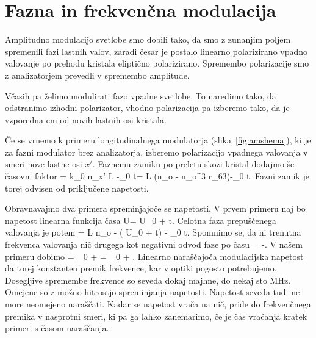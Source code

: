 \section{Fazna in frekvenčna modulacija}

Amplitudno modulacijo svetlobe smo dobili tako, da smo z zunanjim
poljem spremenili fazi lastnih valov, zaradi česar je postalo linearno
polarizirano vpadno valovanje po prehodu kristala eliptično polarizirano.
Spremembo polarizacije smo z analizatorjem prevedli v spremembo amplitude.

Včasih pa želimo modulirati fazo vpadne svetlobe. To naredimo tako,
da odstranimo izhodni polarizator, vhodno polarizacija pa izberemo tako, da je vzporedna 
eni od novih lastnih osi kristala. 

Če se vrnemo k primeru longitudinalnega modulatorja (slika~\ref{fig:amshema}), 
ki je za fazni modulator brez analizatorja, izberemo polarizacijo 
vpadnega valovanja v smeri nove lastne osi $x'$. Faznemu zamiku po preletu skozi
kristal dodajmo še časovni faktor
\beq
\phi =  k_0 n_{x'} L -\omega_0 t= L \left(n_o -
n_o^3 r_{63}\right)-\omega_0 t.
\eeq
Fazni zamik je torej odvisen od priključene napetosti.

Obravnavajmo dva primera spreminjajoče se napetosti. V prvem primeru naj bo 
napetost linearna funkcija časa 
\beq
U= U_0 + t.
\eeq
Celotna faza prepuščenega valovanja je potem
\beq
\phi = L n_o - \left( U_0 + 
t\right) - \omega_0 t.
\eeq
Spomnimo se, da ni trenutna frekvenca valovanja nič drugega kot negativni odvod faze po času
\beq
\omega = -.
\eeq
V našem primeru dobimo 
\beq
\omega = \omega_0 +  = 
\omega_0 + \Delta \omega.
\eeq
Linearno naraščajoča modulacijska napetost da torej konstanten premik frekvence, kar v optiki 
pogosto potrebujemo. Dosegljive spremembe frekvence so seveda dokaj majhne,
do nekaj sto MHz. Omejene so z možno hitrostjo spreminjanja napetosti.
Napetost seveda tudi ne more neomejeno naraščati. Kadar se napetost
vrača na nič, pride do frekvenčnega premika v nasprotni smeri, ki pa ga
lahko zanemarimo, če je čas vračanja kratek primeri s časom naraščanja.

